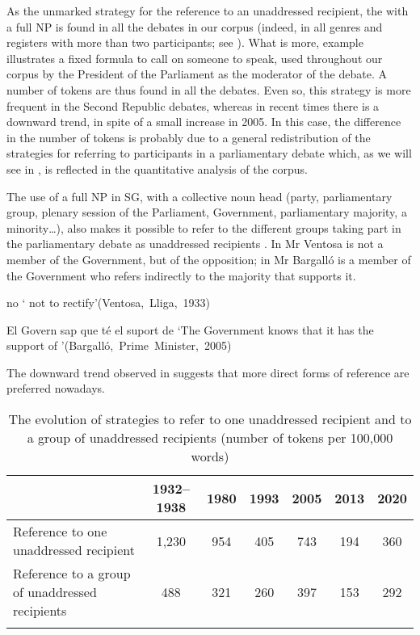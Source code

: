 \documentclass[output=paper]{langscibook}
\begin{document}
As the unmarked strategy for the reference to an unaddressed recipient, the  with a full NP is found in all the debates in our corpus (indeed, in all genres and registers with more than two participants; see \cites[140–141]{Nogué2011}[233–234]{Nogué2015}). What is more, example  illustrates a fixed formula to call on someone to speak, used throughout our corpus by the President of the Parliament as the moderator of the debate. A number of tokens are thus found in all the debates. Even so, this strategy is more frequent in the Second Republic debates, whereas in recent times there is a downward trend, in spite of a small increase in 2005. In this case, the difference in the number of tokens is probably due to a general redistribution of the strategies for referring to participants in a parliamentary debate which, as we will see in , is reflected in the quantitative analysis of the corpus.



The use of a full NP in SG, with a collective noun head (party, parliamentary group, plenary session of the Parliament, Government, parliamentary majority, a minority…), also makes it possible to refer to the different groups taking part in the parliamentary debate as unaddressed recipients . In  Mr Ventosa is not a member of the Government, but of the opposition; in  Mr Bargalló is a member of the Government who refers indirectly to the majority that supports it.  


\ea\label{ex:nogue:33}
 \ea\label{ex:nogue:33a}
{ {no} }
\glt `   not  to rectify'\hfill\hbox{(Ventosa, Lliga, 1933)}

\ex\label{ex:nogue:33b}
{{El Govern sap que té el suport de} }
\glt `The Government knows that it has the support of     '\hfill\hbox{(Bargalló, Prime Minister, 2005)}
\z \z 


The downward trend observed in  suggests that more direct forms of reference are preferred nowadays.


\begin{table}
\begin{tabularx}{\textwidth}{Qcccccc}
\lsptoprule
& {1932–1938} & {1980} & {1993} & {2005} & {2013} & {{2020}}\\\midrule
Reference to one unaddressed recipient & 1,230 & 954 & 405 & 743 & 194 & 360\\\midrule
Reference to a group of unaddressed recipients & 488 & 321 & 260 & 397 & 153 & 292\\\lspbottomrule
\end{tabularx}
\caption{The evolution of  strategies to refer to one unaddressed recipient and to a group of unaddressed recipients (number of tokens per 100,000 words)}
\label{tab:nogue:15}
\end{table}
\end{document}
